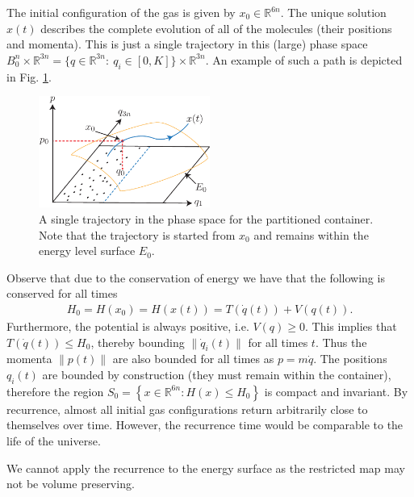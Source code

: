 \begin{ex}
The initial configuration of the gas is given by $x_0\in \mathbb{R}^{6n}$. The unique solution $x(t)$ describes the complete evolution of all of the molecules (their positions and momenta). This is just a single trajectory in this (large) phase space $B_0^{n}\times \mathbb{R}^{3n} = \{q \in \mathbb{R}^{3n}:\ q_i \in [0,K]\} \times \mathbb{R}^{3n}$. An example of such a path is depicted in Fig. \ref{fig:partitioned_gas_path}.
\begin{figure}[h!]
	\centering
	\includegraphics[width=0.5\textwidth]{figures/ch8/15partitioned_container_path.pdf}
	\caption{A single trajectory in the phase space for the partitioned container. Note that the trajectory is started from $x_0$ and remains within the energy level surface $E_0$.}
	\label{fig:partitioned_gas_path}
\end{figure}
Observe that due to the conservation of energy we have that the following is conserved for all times
\begin{align}
	H_0 = H(x_0) = H(x(t)) = T(\dot{q}(t)) + V(q(t)).
\end{align}
Furthermore, the potential is always positive, i.e. $V(q) \geq 0$. This implies that $T(\dot{q}(t)) \leq H_0$, thereby bounding $\|\dot{q}_i(t)\|$ for all times $t$. Thus the momenta $\|p(t)\|$ are also bounded for all times as $p = m\dot{q}$. The positions $q_i(t)$ are bounded by construction (they must remain within the container), therefore the region $S_0= \left\{ x \in \mathbb{R}^{6n}: H(x) \leq H_0 \right\}$ is compact and invariant. By recurrence, almost all initial gas configurations return arbitrarily close to themselves over time. However, the recurrence time would be comparable to the life of the universe. 
\begin{remark}[]
	We cannot apply the recurrence to the energy surface as the restricted map may not be volume preserving.
\end{remark}
\end{ex}

